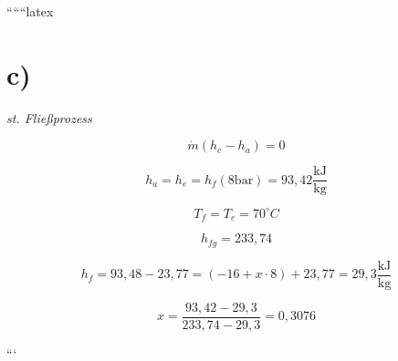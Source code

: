 ``````latex


\section*{c)}

\textit{st. Fließprozess}

\[
\dot{m} (h_e - h_a) = 0
\]

\[
h_a = h_e = h_f (8 \text{bar}) = 93,42 \frac{\text{kJ}}{\text{kg}}
\]

\[
T_f = T_e = 70^\circ C
\]

\[
h_{fg} = 233,74
\]

\[
h_f = 93,48 - 23,77 = (-16 + x \cdot 8) + 23,77 = 29,3 \frac{\text{kJ}}{\text{kg}}
\]

\[
x = \frac{93,42 - 29,3}{233,74 - 29,3} = 0,3076
\]

```